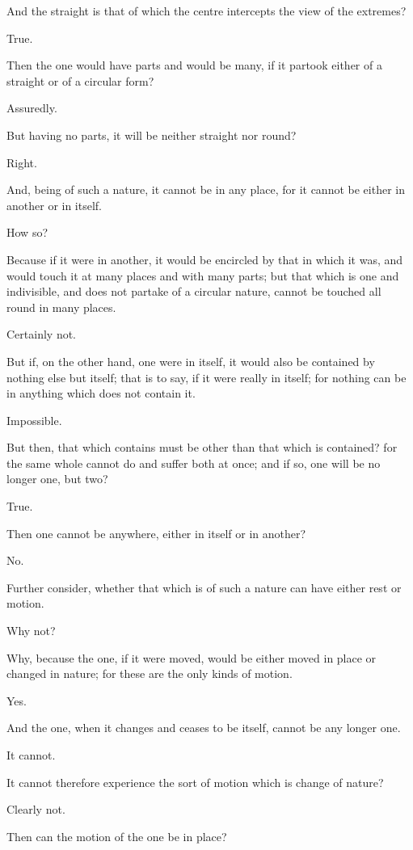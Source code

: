 And the straight is that of which the centre intercepts the view of the
extremes?

True.

Then the one would have parts and would be many, if it partook either of
a straight or of a circular form?

Assuredly.

But having no parts, it will be neither straight nor round?

Right.

And, being of such a nature, it cannot be in any place, for it cannot be
either in another or in itself.

How so?

Because if it were in another, it would be encircled by that in which
it was, and would touch it at many places and with many parts; but that
which is one and indivisible, and does not partake of a circular nature,
cannot be touched all round in many places.

Certainly not.

But if, on the other hand, one were in itself, it would also be
contained by nothing else but itself; that is to say, if it were really
in itself; for nothing can be in anything which does not contain it.

Impossible.

But then, that which contains must be other than that which is
contained? for the same whole cannot do and suffer both at once; and if
so, one will be no longer one, but two?

True.

Then one cannot be anywhere, either in itself or in another?

No.

Further consider, whether that which is of such a nature can have either
rest or motion.

Why not?

Why, because the one, if it were moved, would be either moved in place
or changed in nature; for these are the only kinds of motion.

Yes.

And the one, when it changes and ceases to be itself, cannot be any
longer one.

It cannot.

It cannot therefore experience the sort of motion which is change of
nature?

Clearly not.

Then can the motion of the one be in place?

